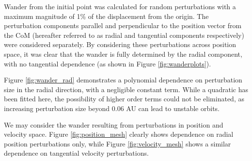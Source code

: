 \documentclass[11pt, a4paper,twocolumn]{article} %
\begin{document}
Wander from the initial point was calculated for random perturbations with a maximum magnitude of 1\% of the displacement from the origin. The perturbation components parallel and perpendicular to the position vector from the CoM (hereafter referred to as radial and tangential components respectively) were considered separately. By considering these perturbations across position space, it was clear that the wander is fully determined by the radial component, with no tangential dependence (as shown in Figure \ref{fig:wanderplots}).

Figure \ref{fig:wander_rad} demonstrates a polynomial dependence on perturbation size in the radial direction, with a negligible constant term. While a quadratic has been fitted here, the possibility of higher order terms could not be eliminated, as increasing perturbation size beyond 0.06 AU can lead to unstable orbits.

We may consider the wander resulting from perturbations in position and velocity space. Figure \ref{fig:position_mesh} clearly shows dependence on radial position perturbations only, while Figure \ref{fig:velocity_mesh} shows a similar dependence on tangential velocity perturbations.
\end{document}
